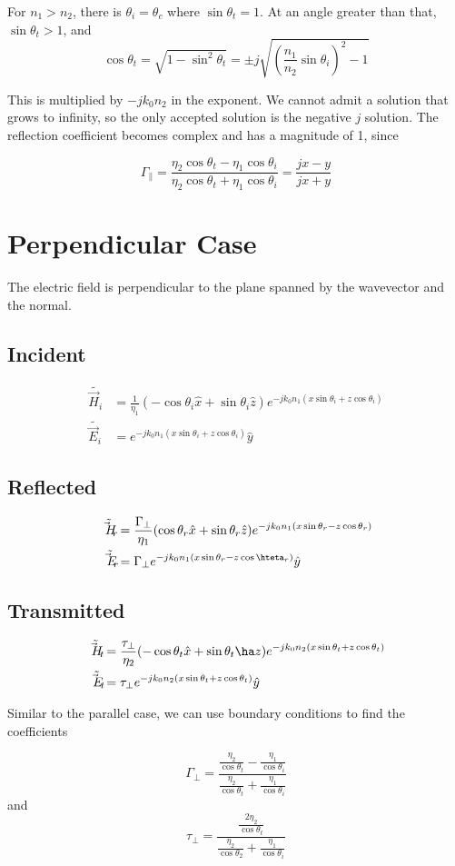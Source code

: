 \documentclass[12pt]{article}
\begin{document}
For $n_1 > n_2$, there is $\theta_i = \theta_c$ where $\sin\theta_t = 1$. At an angle greater than that, $\sin\theta_t > 1$, and
$$\cos\theta_t = \sqrt{1 - \sin^2\theta_t} = \pm j\sqrt{\left(\frac{n_1}{n_2}\sin\theta_i\right)^2 - 1}$$

This is multiplied by $-jk_0n_2$ in the exponent. We cannot admit a solution that grows to infinity, so the only accepted solution is the negative $j$ solution. The reflection coefficient becomes complex and has a magnitude of 1, since

$$\Gamma_\parallel = \frac{\eta_2\cos\theta_t - \eta_1\cos\theta_i}{\eta_2\cos\theta_t + \eta_1\cos\theta_i} = \frac{jx - y}{jx + y}$$

\section{Perpendicular Case}

The electric field is perpendicular to the plane spanned by the wavevector and the normal.

\subsection{Incident}

\begin{align*}
    \tilde{\vec H_i} &= \frac{1}{\eta_1} (-\cos\theta_i\hat x + \sin\theta_i\hat z) e^{-jk_0n_1(x\sin\theta_i + z\cos\theta_i)} \\
    \tilde{\vec E_i} &= e^{-jk_0n_1(x\sin\theta_i + z\cos\theta_i)} \hat y
\end{align*}

\subsection{Reflected}

\begin{align*}
    \tilde{\vec H_r} &= \frac{\Gamma_\perp}{\eta_1} (\cos\theta_r \hat x + \sin\theta_r\hat z)e^{-jk_0n_1(x\sin\theta_r - z\cos\theta_r)} \\
    \tilde{\vec E_r} &= \Gamma_\perp e^{-jk_0n_1(x\sin\theta_r - z\cos\hteta_r)}\hat y
\end{align*}

\subsection{Transmitted}

\begin{align*}
    \tilde{\vec H_t} &= \frac{\tau_\perp}{\eta_2} (-\cos\theta_t \hat x + \sin\theta_t \ha z)e^{-jk_0n_2(x\sin\theta_t + z\cos\theta_t)} \\
    \tilde{\vec E_t} &= \tau_\perp e^{-jk_0n_2(x\sin\theta_t + z\cos\theta_t)}\hat y
\end{align*}

Similar to the parallel case, we can use boundary conditions to find the coefficients

$$\Gamma_\perp = \frac{\frac{\eta_2}{\cos\theta_t} - \frac{\eta_1}{\cos\theta_i}}{\frac{\eta_2}{\cos\theta_t} + \frac{\eta_1}{\cos\theta_i}}$$
and
$$\tau_\perp = \frac{\frac{2\eta_2}{\cos\theta_t}}{\frac{\eta_2}{\cos\theta_2} + \frac{\eta_1}{\cos\theta_i}}$$
\end{document}
